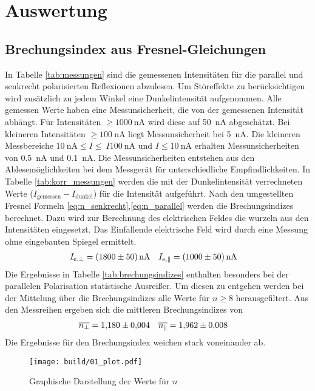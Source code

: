 \section{Auswertung}

\subsection{Brechungsindex aus Fresnel-Gleichungen}



In Tabelle \ref{tab:messungen} sind die gemessenen Intensitäten für die parallel 
und senkrecht polarisierten Reflexionen abzulesen.
Um Störeffekte zu berücksichtigen wird zusätzlich zu jedem Winkel eine Dunkelintensität aufgenommen.
Alle gemessen Werte haben eine Messunsicherheit, die von der gemessenen Intensität abhängt.
Für Intensitäten $\geq \qty{1000}{\nano\ampere}$ wird diese auf \qty{50}{\nano\ampere} abgeschätzt.
Bei kleineren Intensitäten $\geq \qty{100}{\nano\ampere}$ liegt Messunsicherheit bei \qty{5}{\nano\ampere}.
Die kleineren Messbereiche $\qty{10}{\nano\ampere} \leq I \leq \ I \qty{100}{\nano\ampere}$ und $I \leq \qty{10}{\nano\ampere}$
erhalten Messunsicherheiten von \qty{0.5}{\nano\ampere} und \qty{0.1}{\nano\ampere}. 
Die Messunsicherheiten entstehen aus den Ablesemöglichkeiten bei dem Messgerät für unterschiedliche Empfindlichkeiten.
In Tabelle \ref{tab:korr_messungen} werden die mit der Dunkelintensität verrechneten Werte ($I_\text{gemessen} - I_\text{dunkel}$)
für die Intensität aufgeführt.
Nach den umgestellten Fresnel Formeln \eqref{eq:n_senkrecht},\eqref{eq:n_parallel} werden die Brechungsindizes berechnet.
Dazu wird zur Berechnung des elektrischen Feldes die wurzeln aus den Intensitäten eingesetzt.
Das Einfallende elektrische Feld wird durch eine Messung ohne eingebauten Spiegel ermittelt.
\begin{align}
    I_{\text{e},\perp} &= \qty{1800 \pm 50}{\nano\ampere} & I_{\text{e},\parallel} &= \qty{1000 \pm 50}{\nano\ampere}
\end{align} 
Die Ergebnisse in Tabelle \ref{tab:brechungsindizes} enthalten besonders bei der 
parallelen Polarisation statistische Ausreißer. 
Um diesen zu entgehen werden bei der Mittelung über die Brechungsindizes alle Werte für $n \geq 8$ herausgefiltert.
Aus den Messreihen ergeben sich die mittleren Brechungsindizes von 
\begin{align}
    \overline{n_\perp} &= \num{1.180 \pm 0.004} & \overline{n_\parallel} &= \num{1.962 \pm 0.008}
\end{align}
Die Ergebnisse für den Brechungsindex weichen stark voneinander ab.
\begin{figure}
    \centering
    \texttt{[image: build/01\_plot.pdf]}
    \caption{Graphische Darstellung der Werte für $n$}
\end{figure}

